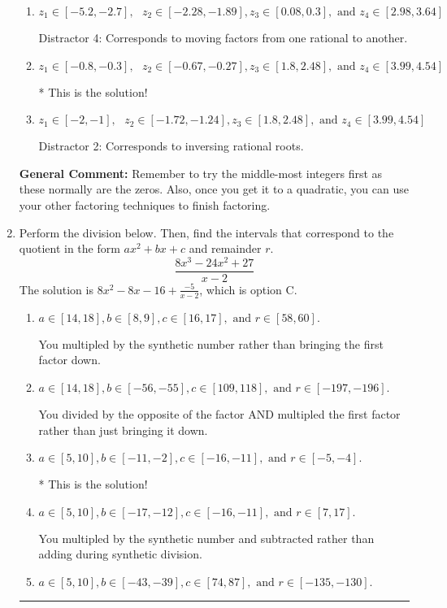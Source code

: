 \documentclass{extbook}[14pt]
\newcommand{\litem}[1]{\item #1

\rule{\textwidth}{0.4pt}}
\begin{document}
\begin{enumerate}
{\begin{enumerate}[label=\Alph*.]
 Distractor 3: Corresponds to negatives of all zeros AND inversing rational roots.
\item \( z_1 \in [-5.2, -2.7], \text{   }  z_2 \in [-2.28, -1.89], z_3 \in [0.08, 0.3], \text{   and   } z_4 \in [2.98, 3.64] \)

 Distractor 4: Corresponds to moving factors from one rational to another.
\item \( z_1 \in [-0.8, -0.3], \text{   }  z_2 \in [-0.67, -0.27], z_3 \in [1.8, 2.48], \text{   and   } z_4 \in [3.99, 4.54] \)

* This is the solution!
\item \( z_1 \in [-2, -1], \text{   }  z_2 \in [-1.72, -1.24], z_3 \in [1.8, 2.48], \text{   and   } z_4 \in [3.99, 4.54] \)

 Distractor 2: Corresponds to inversing rational roots.
\end{enumerate}

\textbf{General Comment:} Remember to try the middle-most integers first as these normally are the zeros. Also, once you get it to a quadratic, you can use your other factoring techniques to finish factoring.
}
\litem{
Perform the division below. Then, find the intervals that correspond to the quotient in the form $ax^2+bx+c$ and remainder $r$.
\[ \frac{8x^{3} -24 x^{2} + 27}{x -2} \]The solution is \( 8x^{2} -8 x -16 + \frac{-5}{x -2} \), which is option C.\begin{enumerate}[label=\Alph*.]
\item \( a \in [14, 18], b \in [8, 9], c \in [16, 17], \text{ and } r \in [58, 60]. \)

 You multipled by the synthetic number rather than bringing the first factor down.
\item \( a \in [14, 18], b \in [-56, -55], c \in [109, 118], \text{ and } r \in [-197, -196]. \)

 You divided by the opposite of the factor AND multipled the first factor rather than just bringing it down.
\item \( a \in [5, 10], b \in [-11, -2], c \in [-16, -11], \text{ and } r \in [-5, -4]. \)

* This is the solution!
\item \( a \in [5, 10], b \in [-17, -12], c \in [-16, -11], \text{ and } r \in [7, 17]. \)

 You multipled by the synthetic number and subtracted rather than adding during synthetic division.
\item \( a \in [5, 10], b \in [-43, -39], c \in [74, 87], \text{ and } r \in [-135, -130]. \)


\end{enumerate}}
\end{enumerate}
\end{document}
